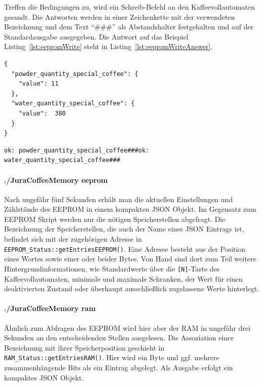 Treffen die Bedingungen zu, wird ein Schreib-Befehl an den Kaffeevollautomaten gesandt.
Die Antworten werden in einer Zeichenkette mit der verwendeten Bezeichnung und dem Text "`\#\#\#"' als Abstandshalter festgehalten und auf der Standardausgabe ausgegeben.
Die Antwort auf das Beispiel Listing~\ref{lst:eepromWrite} steht in Listing~\ref{lst:eepromWriteAnswer}.

\begin{lstlisting}[label=lst:eepromWrite,caption={Beispiel einer JSON Eingabe für./JuraCoffeeMemory eepromWrite}]
{
  "powder_quantity_special_coffee": {
    "value": 11
  },
  "water_quantity_special_coffee": {
    "value":  380
  }
}
\end{lstlisting}

\begin{lstlisting}[label=lst:eepromWriteAnswer,caption={Antwort auf das Beispiel der JSON Eingabe}]
ok: powder_quantity_special_coffee###ok: water_quantity_special_coffee###
\end{lstlisting}

\paragraph{./JuraCoffeeMemory eeprom}
Nach ungefähr fünf Sekunden erhält man die aktuellen Einstellungen und Zählstände des \ac{EEPROM} in einem kompakten \ac{JSON} Objekt.
Im Gegensatz zum EEPROM Skript werden nur die nötigen Speicherstellen abgefragt.
Die Bezeichnung der Speicherstellen, die auch der Name eines \ac{JSON} Eintrags ist, befindet sich mit der zugehörigen Adresse in \texttt{EEPROM\_Status::getEntriesEEPROM()}.
Eine Adresse besteht aus der Position eines Wortes sowie einer oder beider Bytes.
Von Hand sind dort zum Teil weitere Hintergrundinformationen, wie Standardwerte über die \texttt{[N]}-Taste des Kaffeevollautomaten, minimale und maximale Schranken, der Wert für einen deaktivierten Zustand oder überhaupt ausschließlich zugelassene Werte hinterlegt.

\paragraph{./JuraCoffeeMemory ram}
Ähnlich zum Abfragen des \ac{EEPROM} wird hier aber der \ac{RAM} in ungefähr drei Sekunden an den entscheidenden Stellen ausgelesen.
Die Assoziation einer Bezeichnung mit ihrer Speicherposition geschieht in \texttt{RAM\_Status::getEntriesRAM()}.
Hier wird ein Byte und ggf. mehrere zusammenhängende Bits als ein Eintrag abgelegt.
Als Ausgabe erfolgt ein kompaktes \ac{JSON} Objekt.

